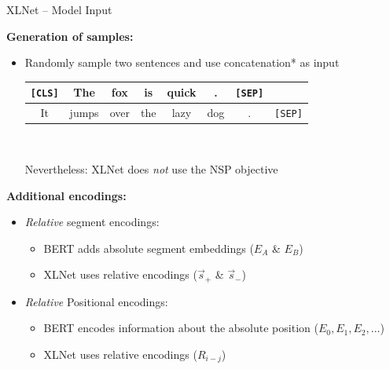 \begin{frame}{XLNet -- Model Input}

\vfill

\textbf{Generation of samples:}

\begin{itemize}
\item Randomly sample two sentences and use concatenation* as input
			{\footnotesize
\begin{center}
\begin{tabular}{|cccccccc|}
\hline
\cellcolor{blue!15}\texttt{[CLS]} & The & fox & is & quick & . & \cellcolor{blue!15}\texttt{[SEP]} &\\\hline\hline It & jumps & over & the & lazy & dog & . & \cellcolor{blue!15}\texttt{[SEP]} \\
\hline
\end{tabular}\\\mbox{}
\end{center}}
{\scriptsize *Nevertheless: XLNet does \textit{not} use the NSP objective }
\end{itemize}

\textbf{Additional encodings:}

\begin{itemize}
\item \textit{Relative} segment encodings:
	\begin{itemize}
		\item BERT adds absolute segment embeddings ($E_A$ \& $E_B$)
		\item XLNet uses relative encodings ($\vec{s}_+$ \& $\vec{s}_-$)
	\end{itemize}
\item \textit{Relative} Positional encodings:
	\begin{itemize}
		\item BERT encodes information about the absolute position ($E_0, E_1, E_2, \hdots$)
		\item XLNet uses relative encodings ($R_{i - j}$)
	\end{itemize}
\end{itemize}

\vfill

\end{frame}


